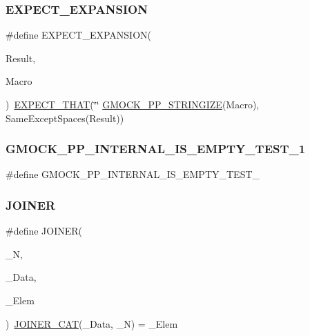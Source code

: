 \subsubsection{\texorpdfstring{EXPECT\_EXPANSION}{EXPECT\_EXPANSION}}
{\footnotesize\ttfamily \#define E\+X\+P\+E\+C\+T\+\_\+\+E\+X\+P\+A\+N\+S\+I\+ON(\begin{DoxyParamCaption}\item[{}]{Result,  }\item[{}]{Macro }\end{DoxyParamCaption})~\mbox{\hyperlink{_obj__test_2lib_2googletest-release-1_88_81_2googlemock_2include_2gmock_2gmock-matchers_8h_ac31e206123aa702e1152bb2735b31409}{E\+X\+P\+E\+C\+T\+\_\+\+T\+H\+AT}}(\char`\"{}\char`\"{} \mbox{\hyperlink{_obj__test_2lib_2googletest-master_2googlemock_2include_2gmock_2internal_2gmock-pp_8h_a5e7b60e34a7bb66bac56c440f6aa52cb}{G\+M\+O\+C\+K\+\_\+\+P\+P\+\_\+\+S\+T\+R\+I\+N\+G\+I\+ZE}}(Macro), Same\+Except\+Spaces(Result))}

\mbox{\label{_obj__test_2lib_2googletest-master_2googlemock_2test_2gmock-pp-string__test_8cc_ab8635d85cb91992914a106bb5c229829}} 
\subsubsection{\texorpdfstring{GMOCK\_PP\_INTERNAL\_IS\_EMPTY\_TEST\_1}{GMOCK\_PP\_INTERNAL\_IS\_EMPTY\_TEST\_1}}
{\footnotesize\ttfamily \#define G\+M\+O\+C\+K\+\_\+\+P\+P\+\_\+\+I\+N\+T\+E\+R\+N\+A\+L\+\_\+\+I\+S\+\_\+\+E\+M\+P\+T\+Y\+\_\+\+T\+E\+S\+T\+\_}

\mbox{\label{_obj__test_2lib_2googletest-master_2googlemock_2test_2gmock-pp-string__test_8cc_a417889002d582097e444f103350c05cb}} 
\subsubsection{\texorpdfstring{JOINER}{JOINER}}
{\footnotesize\ttfamily \#define J\+O\+I\+N\+ER(\begin{DoxyParamCaption}\item[{}]{\+\_\+N,  }\item[{}]{\+\_\+\+Data,  }\item[{}]{\+\_\+\+Elem }\end{DoxyParamCaption})~\mbox{\hyperlink{_obj__test_2lib_2googletest-master_2googlemock_2test_2gmock-pp-string__test_8cc_a061e03ac22467881369813e8d73ddf61}{J\+O\+I\+N\+E\+R\+\_\+\+C\+AT}}(\+\_\+\+Data, \+\_\+N) = \+\_\+\+Elem}

